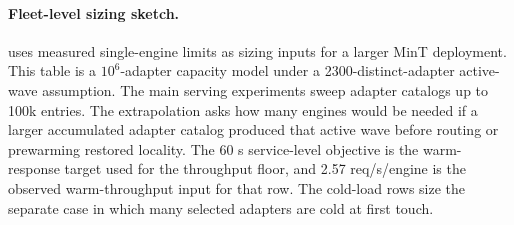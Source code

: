 \documentclass{llmxive}
\begin{document}
\begin{appendices}
\paragraph{Fleet-level sizing sketch.}
 uses measured single-engine limits as sizing inputs for a larger MinT deployment. This table is a $10^6$-adapter capacity model under a 2300-distinct-adapter active-wave assumption. The main serving experiments sweep adapter catalogs up to 100k entries. The extrapolation asks how many engines would be needed if a larger accumulated adapter catalog produced that active wave before routing or prewarming restored locality. The 60 s service-level objective is the warm-response target used for the throughput floor, and 2.57 req/s/engine is the observed warm-throughput input for that row. The cold-load rows size the separate case in which many selected adapters are cold at first touch.

\end{appendices}
\end{document}
